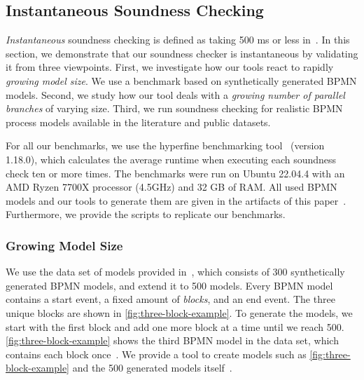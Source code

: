 \documentclass[runningheads]{llncs}
\begin{document}
\subsection{Instantaneous Soundness Checking} \label{subsec:instantaneous}
\textit{Instantaneous} soundness checking is defined as taking 500 ms or less in~\cite{fahlandAnalysisDemandInstantaneous2011}.
In this section, we demonstrate that our soundness checker is instantaneous by validating it from three viewpoints.
First, we investigate how our tools react to rapidly \textit{growing model size}.
We use a benchmark based on synthetically generated BPMN models.
Second, we study how our tool deals with a \textit{growing number of parallel branches} of varying size.
Third, we run soundness checking for realistic BPMN process models available in the literature and public datasets.

For all our benchmarks, we use the hyperfine benchmarking tool~\cite{peterHyperfine2023} (version 1.18.0), which calculates the average runtime when executing each soundness check ten or more times.
The benchmarks were run on Ubuntu 22.04.4 with an AMD Ryzen 7700X processor (4.5GHz) and 32 GB of RAM.
All used BPMN models and our tools to generate them are given in the artifacts of this paper~\cite{noauthorgivenBPM2024Artifacts2024}.
Furthermore, we provide the scripts to replicate our benchmarks.

\subsubsection{Growing Model Size}
We use the data set of models provided in~\cite{krauterHigherorderTransformationApproach2023}, which consists of 300 synthetically generated BPMN models, and extend it to 500 models.
Every BPMN model contains a start event, a fixed amount of \textit{blocks}, and an end event.
The three unique blocks are shown in \autoref{fig:three-block-example}.
To generate the models, we start with the first block and add one more block at a time until we reach 500.
\autoref{fig:three-block-example} shows the third BPMN model in the data set, which contains each block once~\cite{krauterHigherorderTransformationApproach2023}.
We provide a tool to create models such as \autoref{fig:three-block-example} and the 500 generated models itself~\cite{noauthorgivenBPM2024Artifacts2024}.
\end{document}
